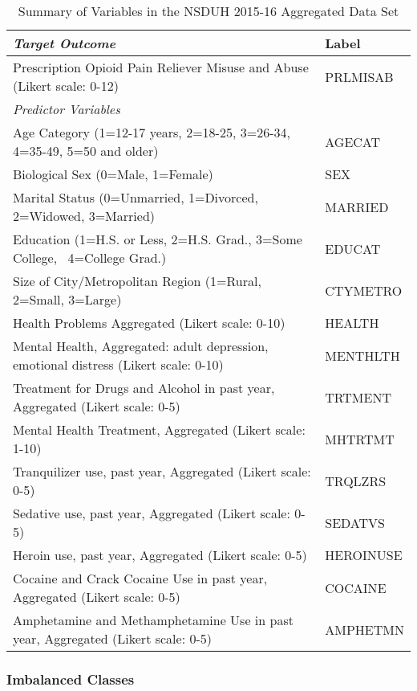 \documentclass[sigconf]{acmart}
\begin{document}
\begin{table*}[ht]
  \caption{Summary of Variables in the NSDUH 2015-16 Aggregated Data Set}
  \label{tab:freq}
  \begin{tabular}{ll}
    \toprule
    \textit{Target Outcome} & Label \\
    \midrule
    Prescription Opioid Pain Reliever Misuse and Abuse (Likert scale: 0-12)& PRLMISAB  \\
    \midrule
    \textit{Predictor Variables}&   \\
    \midrule
    Age Category (1=12-17 years, 2=18-25, 3=26-34, 4=35-49, 5=50 and older)& AGECAT \\
    Biological Sex (0=Male, 1=Female)& SEX  \\
    Marital Status (0=Unmarried, 1=Divorced, 2=Widowed, 3=Married)& MARRIED  \\
    Education (1=H.S. or Less, 2=H.S. Grad., 3=Some College,  4=College Grad.)& EDUCAT  \\
    Size of City/Metropolitan Region (1=Rural, 2=Small, 3=Large)& CTYMETRO  \\
    Health Problems Aggregated  (Likert scale: 0-10)& HEALTH  \\
    Mental Health, Aggregated: adult depression, emotional distress (Likert scale: 0-10)& MENTHLTH  \\
    Treatment for Drugs and Alcohol in past year, Aggregated (Likert scale: 0-5)& TRTMENT  \\
    Mental Health Treatment, Aggregated (Likert scale: 1-10)& MHTRTMT  \\
    Tranquilizer use, past year, Aggregated (Likert scale: 0-5)& TRQLZRS \\
    Sedative use, past year, Aggregated (Likert scale: 0-5)& SEDATVS  \\
    Heroin use, past year, Aggregated (Likert scale: 0-5)& HEROINUSE  \\
    Cocaine and Crack Cocaine Use in past year, Aggregated  (Likert scale: 0-5)& COCAINE  \\
    Amphetamine and Methamphetamine Use in past year, Aggregated (Likert scale: 0-5)& AMPHETMN  \\
    \bottomrule
  \end{tabular}
\end{table*}


\subsubsection{Imbalanced Classes}
\end{document}
